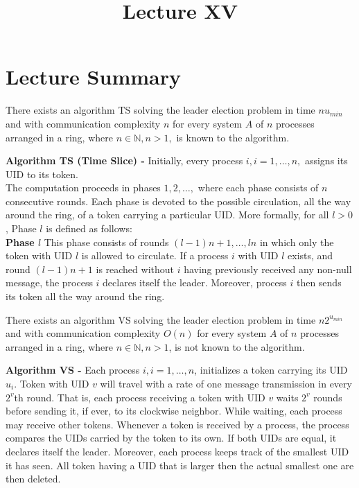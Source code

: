 \documentclass[a4paper]{article}
\title{\vspace{-2cm}Lecture XV\vspace{-2cm}}
\date{}
\begin{document}
\maketitle
\section{Lecture Summary}
\begin{theorem}
There exists an algorithm TS solving the leader election problem in time $nu_{min}$ and with communication complexity $n$ for every system $A$ of $n$ processes arranged in a ring, where $n \in \mathbb{N}, n > 1,$ is known to the algorithm.
\end{theorem}


\begin{algorithm}
\textbf{Algorithm TS (Time Slice) -} Initially, every process $i, i = 1, \ldots, n,$ assigns its UID to its token. \\
The computation proceeds in phases $1, 2, \ldots,$ where each phase consists of $n$ consecutive rounds. Each phase is devoted to the possible circulation, all the way around the ring, of a token carrying a particular UID. More formally, for all $l > 0$, Phase $l$ is defined as follows: \\
\textbf{Phase $l$} This phase consists of rounds $(l - 1)n + 1, \ldots, ln$ in which only the token with UID $l$ is allowed to circulate. If a process $i$ with UID $l$ exists, and round $(l - 1)n + 1$ is reached without $i$ having previously received any non-null message, the process $i$ declares itself the leader. Moreover, process $i$ then sends its token all the way around the ring.
\end{algorithm}


\begin{theorem}
There exists an algorithm VS solving the leader election problem in time $n2^{u_{min}}$ and with communication complexity $O(n)$ for every system $A$ of $n$ processes arranged in a ring, where $n \in \mathbb{N}, n > 1$, is not known to the algorithm.
\end{theorem}


\begin{algorithm}
\textbf{Algorithm VS -} Each process $i, i = 1, \ldots, n$, initializes a token carrying its UID $u_{i}$. Token with UID $v$ will travel with a rate of one message transmission in every $2^{v}$th round. That is, each process receiving a token with UID $v$ waits $2^{v}$ rounds before sending it, if ever, to its clockwise neighbor. While waiting, each process may receive other tokens. Whenever a token is received by a process, the process compares the UIDs carried by the token to its own. If both UIDs are equal, it declares itself the leader. Moreover, each process keeps track of the smallest UID it has seen. All token having a UID that is larger then the actual smallest one are then deleted.
\end{algorithm}
\end{document}
